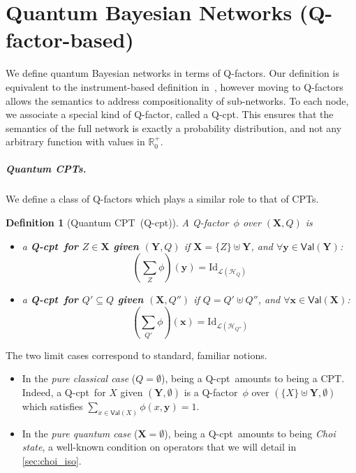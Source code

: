 \documentclass[10pt,a4paper]{article}
\newcommand*{\definitive}[1]{\textbf{#1}}
\newcommand{\Real}{\mathbb{R}}
\newcommand{\nnReal}{\Real^+_0}
\newcommand*{\setofrv}[1]{\mathsf{Val}(#1)}
\newcommand{\bX}{\mathbf X}
\newcommand{\bY}{\mathbf Y}
\newcommand{\bx}{{\mathbf x}}
\newcommand{\by}{{\mathbf y}}
\renewcommand{\L}{\mathcal{L}}
\newcommand{\HH}{\mathcal{H}}
\newcommand{\reg}{Q}
\newcommand{\qreg}{\reg}
\newcommand*{\someqfact}{\phi}
\newcommand*{\id}[1][]{\mathrm{Id}_{#1}}
\newcommand*{\qfactor}{Q-factor}
\newcommand*{\Qfactor}{\qfactor}
\newcommand*{\QCPT}{Quantum CPT}
\newcommand*{\qCPT}{Q-\textsf{cpt}\xspace}
\newtheorem{definition}[theorem]{Definition}
\begin{document}
\section{Quantum Bayesian Networks (\Qfactor-based)}
\label{sec:qbn}

We define quantum Bayesian networks in terms of \qfactor s.
Our definition is equivalent to the instrument-based definition in~\cite{GBN2014}, however moving to \qfactor s allows the semantics to address compositionality of sub-networks.
To each node, we associate a special kind of \qfactor, called a \qCPT.
This ensures that the semantics of the full network is exactly a probability distribution, and not any arbitrary function with values in $\nnReal$.

\subparagraph{Quantum CPTs.}

We define a class of \Qfactor s which plays a similar role to that of CPTs.

\begin{definition}[\QCPT\ (\qCPT)]
\label{def:condition_qfactor_qbn}
A \qfactor\ $\someqfact$ over $(\bX,\qreg)$ is
\begin{itemize}
\item
a \definitive{\qCPT\ for $Z \in \bX$ given $(\bY,\qreg)$} if $\bX = \{Z\} \uplus \bY$, and $\forall \by\in\setofrv{\bY}$:
\begin{equation*}
\left(\sum_{Z} \someqfact\right)(\by)
=
\id[\L(\HH_\qreg)]
\end{equation*}
\item
a \definitive{\qCPT\ for $\qreg' \subseteq \qreg$ given $(\bX, \qreg'')$} if $\qreg = \qreg' \uplus \qreg''$, and $\forall \bx\in\setofrv{\bX}$:
\begin{equation*}
\left(\sum_{\qreg'} \someqfact\right)(\bx)
=
\id[\L(\HH_{\qreg''})]
\end{equation*}
\end{itemize}
\end{definition}

The two limit cases correspond to standard, familiar notions.
\begin{itemize}
\item
In the \emph{pure classical case} ($\qreg=\emptyset$), being a \qCPT\ amounts to being a CPT.
Indeed, a \qCPT\ for $X$ given $(\bY, \emptyset)$ is a \qfactor\ $\someqfact$ over $(\{X\}\uplus\bY,\emptyset)$ which satisfies $\sum_{x\in\setofrv{X}} \someqfact(x,\by) = 1$.
\item
In the \emph{pure quantum case} ($\bX=\emptyset$), being a \qCPT\ amounts to being \emph{Choi state}, a well-known condition on operators that we will detail in \cref{sec:choi_iso}.
\end{itemize}
\end{document}
